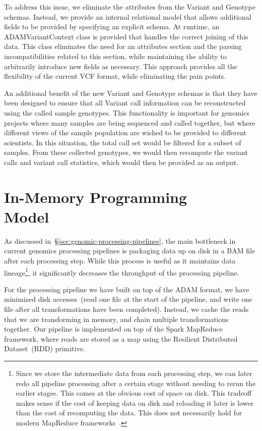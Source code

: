 \documentclass[10pt,twocolumn]{article}
\theoremstyle{plain}
\begin{document}
To address this issue, we eliminate the attributes from the Variant and Genotype schemas. Instead, we provide an internal relational model
that allows additional fields to be provided by specifying an explicit schema. At runtime, an ADAMVariantContext class is provided that
handles the correct joining of this data. This class eliminates the need for an attributes section and the parsing incompatibilities related to this section,
while maintaining the ability to arbitrarily introduce new fields as necessary. This approach provides all the flexibility of the current VCF format, while eliminating
the pain points.

An additional benefit of the new Variant and Genotype schemas is that they have been designed to ensure that all Variant call information
can be reconstructed using the called sample genotypes. This functionality is important for genomics projects where many samples are being
sequenced and called together, but where different views of the sample population are wished to be provided to different scientists. In this situation,
the total call set would be filtered for a subset of samples. From these collected genotypes, we would then recompute the variant calls and variant
call statistics, which would then be provided as an output.

\section{In-Memory Programming\\Model}
\label{sec:in-memory-programming-model}

As discussed in~\S\ref{sec:genomic-processing-pipelines}, the main bottleneck in current genomics processing pipelines is
packaging data up on disk in a BAM file after each processing step. While this process is useful as it maintains data
lineage\footnote{Since we store the intermediate data from each processing step, we can later redo all pipeline processing
after a certain stage without needing to rerun the earlier stages. This comes at the obvious cost of space on disk. This tradeoff
makes sense if the cost of keeping data on disk and reloading it later is lower than the cost of recomputing the data. This
does not necessarily hold for modern MapReduce frameworks~\cite{zaharia12}.}, it significantly decreases the throughput of the
processing pipeline.

For the processing pipeline we have built on top of the ADAM format, we have minimized disk accesses~(read one file at the
start of the pipeline, and write one file after all transformations have been completed). Instead, we cache the reads that we are
transforming in memory, and chain multiple transformations together. Our pipeline is implemented on top of the Spark MapReduce
framework, where reads are stored as a map using the Resilient Distributed Dataset~(RDD) primitive.
\end{document}
